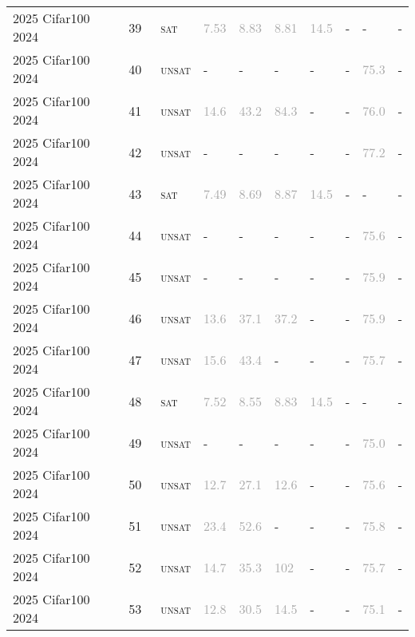 \begin{center}
{\begin{longtable}{@{}llllllllll@{}}
2025 Cifar100 2024 & 39 & ~\textsc{sat} & \textcolor{darkgray}{7.53} & \textcolor{darkgray}{8.83} & \textcolor{darkgray}{8.81} & \textcolor{darkgray}{14.5} & - & - & - \\
2025 Cifar100 2024 & 40 & ~\textsc{unsat} & - & - & - & - & - & \textcolor{darkgray}{75.3} & - \\
2025 Cifar100 2024 & 41 & ~\textsc{unsat} & \textcolor{darkgray}{14.6} & \textcolor{darkgray}{43.2} & \textcolor{darkgray}{84.3} & - & - & \textcolor{darkgray}{76.0} & - \\
2025 Cifar100 2024 & 42 & ~\textsc{unsat} & - & - & - & - & - & \textcolor{darkgray}{77.2} & - \\
2025 Cifar100 2024 & 43 & ~\textsc{sat} & \textcolor{darkgray}{7.49} & \textcolor{darkgray}{8.69} & \textcolor{darkgray}{8.87} & \textcolor{darkgray}{14.5} & - & - & - \\
2025 Cifar100 2024 & 44 & ~\textsc{unsat} & - & - & - & - & - & \textcolor{darkgray}{75.6} & - \\
2025 Cifar100 2024 & 45 & ~\textsc{unsat} & - & - & - & - & - & \textcolor{darkgray}{75.9} & - \\
2025 Cifar100 2024 & 46 & ~\textsc{unsat} & \textcolor{darkgray}{13.6} & \textcolor{darkgray}{37.1} & \textcolor{darkgray}{37.2} & - & - & \textcolor{darkgray}{75.9} & - \\
2025 Cifar100 2024 & 47 & ~\textsc{unsat} & \textcolor{darkgray}{15.6} & \textcolor{darkgray}{43.4} & - & - & - & \textcolor{darkgray}{75.7} & - \\
2025 Cifar100 2024 & 48 & ~\textsc{sat} & \textcolor{darkgray}{7.52} & \textcolor{darkgray}{8.55} & \textcolor{darkgray}{8.83} & \textcolor{darkgray}{14.5} & - & - & - \\
2025 Cifar100 2024 & 49 & ~\textsc{unsat} & - & - & - & - & - & \textcolor{darkgray}{75.0} & - \\
2025 Cifar100 2024 & 50 & ~\textsc{unsat} & \textcolor{darkgray}{12.7} & \textcolor{darkgray}{27.1} & \textcolor{darkgray}{12.6} & - & - & \textcolor{darkgray}{75.6} & - \\
2025 Cifar100 2024 & 51 & ~\textsc{unsat} & \textcolor{darkgray}{23.4} & \textcolor{darkgray}{52.6} & - & - & - & \textcolor{darkgray}{75.8} & - \\
2025 Cifar100 2024 & 52 & ~\textsc{unsat} & \textcolor{darkgray}{14.7} & \textcolor{darkgray}{35.3} & \textcolor{darkgray}{102} & - & - & \textcolor{darkgray}{75.7} & - \\
2025 Cifar100 2024 & 53 & ~\textsc{unsat} & \textcolor{darkgray}{12.8} & \textcolor{darkgray}{30.5} & \textcolor{darkgray}{14.5} & - & - & \textcolor{darkgray}{75.1} & - \\

\end{longtable}}
\end{center}
